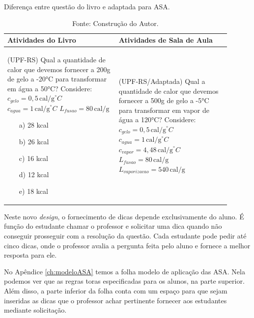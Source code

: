 \begin{table}[ht]
\caption{Diferença entre questão do livro e adaptada para ASA.}
\label{ref:questoes}
\centering
\begin{tabular}{p{0.45\linewidth}|p{0.45\linewidth}}
\hline
\textbf{Atividades do Livro} & \textbf{Atividades de Sala de Aula} \\
\hline
(UPF-RS) Qual a quantidade de calor que devemos fornecer a 200g de gelo a -20°C para transformar em água a 50°C?
\newline Considere:
\newline $c_{gelo} = 0,5 \, \text{cal/g}^{\circ}C$
\newline $c_{agua} = 1 \, \text{cal/g}^{\circ}C$
\newline $L_{fusao} = 80 \, \text{cal/g}$
\begin{itemize}
    \item[a)] 28 kcal
    \item[b)] 26 kcal
    \item[c)] 16 kcal
    \item[d)] 12 kcal
    \item[e)] 18 kcal
\end{itemize} 
& 
(UPF-RS/Adaptada) Qual a quantidade de calor que devemos fornecer a 500g de gelo a -5°C para transformar em vapor de água a 120°C? 
\newline Considere:
\newline $c_{gelo} = 0,5 \, \text{cal/g}^{\circ}C$
\newline $c_{agua} = 1 \, \text{cal/g}^{\circ}C$
\newline $c_{vapor} = 4,48 \, \text{cal/g}^{\circ}C$
\newline $L_{fusao} = 80 \, \text{cal/g}$
\newline $L_{vaporizacao} = 540 \, \text{cal/g}$
\\
\hline
\end{tabular}
\caption*{Fonte: Construção do Autor.}
\end{table}

Neste novo \textit{design}, o fornecimento de dicas depende exclusivamente do aluno. É função do estudante chamar o professor e solicitar uma dica quando não conseguir prosseguir com a resolução da questão. Cada estudante pode pedir até cinco dicas, onde o professor avalia a pergunta feita pelo aluno e fornece a melhor resposta para ele. 

No Apêndice \ref{ch:modeloASA} temos a folha modelo de aplicação das ASA. Nela podemos ver que as regras toras especificadas para os alunos, na parte superior. Além disso, a parte inferior da folha conta com um espaço para que sejam inseridas as dicas que o professor achar pertinente fornecer aos estudantes mediante solicitação. 

